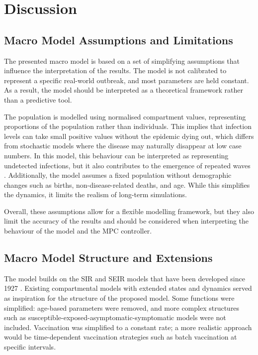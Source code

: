 

\chapter{Discussion}
\label{ch:discussion}

\section{Macro Model Assumptions and Limitations}
\label{sec:disc_macro_assumptions}

The presented macro model is based on a set of simplifying assumptions that influence the interpretation of the results.
The model is not calibrated to represent a specific real-world outbreak, and most parameters are held constant.
As a result, the model should be interpreted as a theoretical framework rather than a predictive tool.

The population is modelled using normalised compartment values, representing proportions of the population rather than individuals.
This implies that infection levels can take small positive values without the epidemic dying out, which differs from stochastic models where the disease may naturally disappear at low case numbers.
In this model, this behaviour can be interpreted as representing undetected infections, but it also contributes to the emergence of repeated waves \citep{hethcote2000}.
Additionally, the model assumes a fixed population without demographic changes such as births, non-disease-related deaths, and age.
While this simplifies the dynamics, it limits the realism of long-term simulations.

Overall, these assumptions allow for a flexible modelling framework, but they also limit the accuracy of the results and should be considered when interpreting the behaviour of the model and the MPC controller.

\section{Macro Model Structure and Extensions}
\label{sec:disc_macro_structure}

The model builds on the SIR and SEIR models that have been developed since 1927 \citep{kermack1927}.
Existing compartmental models with extended states and dynamics served as inspiration for the structure of the proposed model.
Some functions were simplified: age-based parameters were removed, and more complex structures such as susceptible-exposed-asymptomatic-symptomatic models were not included.
Vaccination was simplified to a constant rate; a more realistic approach would be time-dependent vaccination strategies such as batch vaccination at specific intervals.

